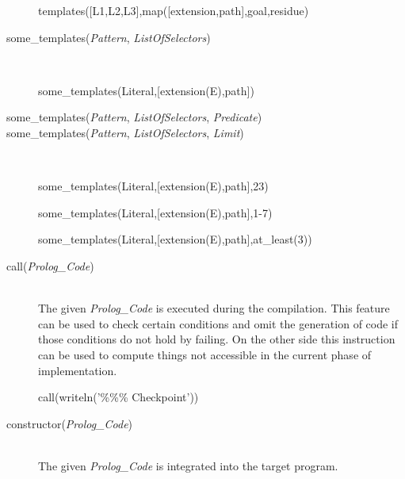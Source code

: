 \begin{description}
    \begin{BoxedSample}
      templates([L1,L2,L3],map([extension,path],goal,residue)%
    \end{BoxedSample}


  \item [some\_templates({\em Pattern},  
    {\em ListOfSelectors})]\ 
    \\

    \begin{BoxedSample}
      some\_templates(Literal,[extension(E),path])%
    \end{BoxedSample}

  \item [some\_templates({\em Pattern},  
			 {\em ListOfSelectors},  
			 {\em Predicate})]

  \item [some\_templates({\em Pattern}, 
    {\em ListOfSelectors},
    {\em Limit})]\ 
    \\

    \begin{BoxedSample}
      some\_templates(Literal,[extension(E),path],23)%
    \end{BoxedSample}
    
    \begin{BoxedSample}
      some\_templates(Literal,[extension(E),path],1-7)%
    \end{BoxedSample}
    
    \begin{BoxedSample}
      some\_templates(Literal,[extension(E),path],at\_least(3))%
    \end{BoxedSample}


  \item [call({\em Prolog\_Code})]\ 
    \\
    The given {\em Prolog\_Code}\/ is executed during the compilation.  This
    feature can be used to check certain conditions and omit the generation of
    code if those conditions do not hold by failing.  On the other side this
    instruction can be used to compute things not accessible in the current
    phase of implementation.
    
    \begin{BoxedSample}
      call(writeln('\%\%\% Checkpoint'))%
    \end{BoxedSample}

  \item [constructor({\em Prolog\_Code})] \ 
    \\
    The given {\em Prolog\_Code}\/ is integrated into the target program.


\end{description}
